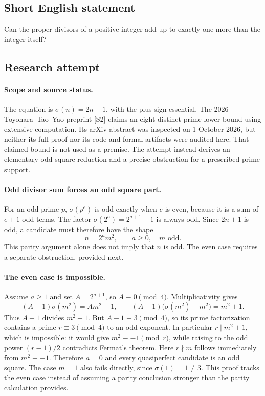 \documentclass[11pt,a4paper]{article}
\begin{document}
\subsection{Short English statement}

Can the proper divisors of a positive integer add up to exactly one more than the integer itself?

\subsection{Research attempt}

\paragraph{Scope and source status.}
The equation is $\sigma(n)=2n+1$, with the plus sign essential. The
2026 Toyohara--Tao--Yao preprint [S2] claims an eight-distinct-prime
lower bound using extensive computation. Its arXiv abstract was
inspected on 1 October 2026, but neither its full proof nor its code and
formal artifacts were audited here. That claimed bound is not used as
a premise. The attempt instead derives an elementary odd-square
reduction and a precise obstruction for a prescribed prime support.

\paragraph{Odd divisor sum forces an odd square part.}
For an odd prime $p$, $\sigma(p^e)$ is odd exactly when $e$ is even,
because it is a sum of $e+1$ odd terms. The factor
$\sigma(2^a)=2^{a+1}-1$ is always odd. Since $2n+1$ is odd, a
candidate must therefore have the shape
\[
                         n=2^a m^2,
 \qquad a\ge0,\quad m\text{ odd}.
\]
This parity argument alone does not imply that $n$ is odd. The even
case requires a separate obstruction, provided next.

\paragraph{The even case is impossible.}
Assume $a\ge1$ and set $A=2^{a+1}$, so $A\equiv0\pmod4$.
Multiplicativity gives
\[
 (A-1)\sigma(m^2)=Am^2+1,
 \qquad
 (A-1)\bigl(\sigma(m^2)-m^2\bigr)=m^2+1.
\]
Thus $A-1$ divides $m^2+1$. But $A-1\equiv3\pmod4$, so its
prime factorization contains a prime $r\equiv3\pmod4$ to an odd
exponent. In particular $r\mid m^2+1$, which is impossible: it would
give $m^2\equiv-1\pmod r$, while raising to the odd power
$(r-1)/2$ contradicts Fermat's theorem. Here $r\nmid m$ follows
immediately from $m^2\equiv-1$.
Therefore $a=0$ and every quasiperfect candidate is an odd square.
The case $m=1$ also fails directly, since $\sigma(1)=1\ne3$.
This proof tracks the even case instead of assuming a parity conclusion
stronger than the parity calculation provides.
\end{document}
